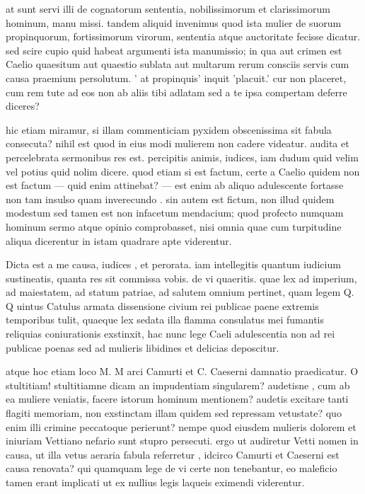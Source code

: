  at sunt servi illi de cognatorum sententia, nobilissimorum et clarissimorum hominum, manu missi. tandem aliquid invenimus quod ista mulier de suorum propinquorum, fortissimorum virorum, sententia atque auctoritate fecisse dicatur. sed scire cupio quid habeat argumenti ista manumissio; in qua aut crimen est Caelio quaesitum aut quaestio sublata aut multarum rerum consciis servis cum causa praemium persolutum. ' at propinquis' inquit 'placuit.' cur non placeret, cum rem tute ad eos non ab aliis tibi adlatam sed a te ipsa compertam deferre diceres?

 hic etiam miramur, si illam commenticiam pyxidem obscenissima sit fabula consecuta? nihil est quod in eius modi mulierem non cadere videatur. audita et percelebrata sermonibus res est. percipitis animis, iudices, iam dudum quid velim vel potius quid nolim dicere. quod etiam si est factum, certe a Caelio quidem non est factum — quid enim attinebat? — est enim ab aliquo adulescente fortasse non tam insulso quam inverecundo . sin autem est fictum, non illud quidem modestum sed tamen est non infacetum mendacium; quod profecto numquam hominum sermo atque opinio comprobasset, nisi omnia quae cum turpitudine aliqua dicerentur in istam quadrare apte viderentur.

 Dicta est a me causa, iudices , et perorata. iam intellegitis quantum iudicium sustineatis, quanta res sit commissa vobis. de vi quaeritis. quae lex ad imperium, ad maiestatem, ad statum patriae, ad salutem omnium pertinet, quam legem Q. Q uintus Catulus armata dissensione civium rei publicae paene extremis temporibus tulit, quaeque lex sedata illa flamma consulatus mei fumantis reliquias coniurationis exstinxit, hac nunc lege Caeli adulescentia non ad rei publicae poenas sed ad mulieris libidines et delicias deposcitur.

 atque hoc etiam loco M. M arci Camurti et C. Caeserni damnatio praedicatur. O stultitiam! stultitiamne dicam an impudentiam singularem? audetisne , cum ab ea muliere veniatis, facere istorum hominum mentionem? audetis excitare tanti flagiti memoriam, non exstinctam illam quidem sed repressam vetustate? quo enim illi crimine peccatoque perierunt? nempe quod eiusdem mulieris dolorem et iniuriam Vettiano nefario sunt stupro persecuti. ergo ut audiretur Vetti nomen in causa, ut illa vetus aeraria fabula referretur , idcirco Camurti et Caeserni est causa renovata? qui quamquam lege de vi certe non tenebantur, eo maleficio tamen erant implicati ut ex nullius legis laqueis eximendi viderentur.

